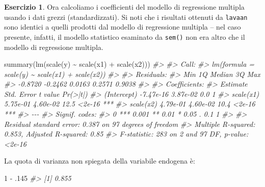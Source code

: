 \documentclass[
  11pt,
]{krantz}
\makeatletter
\newenvironment{Shaded}{\begin{snugshade}}{\end{snugshade}}
\newcommand{\CommentTok}[1]{\textcolor[rgb]{0.37,0.37,0.37}{\textit{#1}}}
\newcommand{\DecValTok}[1]{\textcolor[rgb]{0.06,0.06,0.06}{#1}}
\newcommand{\FunctionTok}[1]{\textcolor[rgb]{0,0,0}{#1}}
\newcommand{\NormalTok}[1]{#1}
\newcommand{\SpecialCharTok}[1]{\textcolor[rgb]{0,0,0}{#1}}
\newenvironment{kframe}{%
\medskip{}
\setlength{\fboxsep}{.8em}
 \def\at@end@of@kframe{}%
 \ifinner\ifhmode%
  \def\at@end@of@kframe{\end{minipage}}%
  \begin{minipage}{\columnwidth}%
 \fi\fi%
 \def\FrameCommand##1{\hskip\@totalleftmargin \hskip-\fboxsep
 \colorbox{shadecolor}{##1}\hskip-\fboxsep
     \hskip-\linewidth \hskip-\@totalleftmargin \hskip\columnwidth}%
 \MakeFramed {\advance\hsize-\width
   \@totalleftmargin\z@ \linewidth\hsize
   \@setminipage}}%
 {\par\unskip\endMakeFramed%
 \at@end@of@kframe}
\renewenvironment{Shaded}{\begin{kframe}}{\end{kframe}}
\theoremstyle{definition}
\theoremstyle{definition}
\theoremstyle{definition}
\newtheorem{exercise}{Esercizio}[chapter]
\theoremstyle{definition}
\theoremstyle{remark}
\makeatother
\begin{document}
\begin{exercise}
Ora calcoliamo i coefficienti del modello di regressione multipla usando i dati grezzi (standardizzati). Si noti che i risultati ottenuti da \texttt{lavaan} sono identici a quelli prodotti dal modello di regressione multipla -- nel caso presente, infatti, il modello statistico esaminato da \texttt{sem()} non era altro che il modello di regressione multipla.

\begin{Shaded}
\begin{Highlighting}[]
\FunctionTok{summary}\NormalTok{(}\FunctionTok{lm}\NormalTok{(}\FunctionTok{scale}\NormalTok{(y) }\SpecialCharTok{\textasciitilde{}} \FunctionTok{scale}\NormalTok{(x1) }\SpecialCharTok{+} \FunctionTok{scale}\NormalTok{(x2)))}
\CommentTok{\#\textgreater{} }
\CommentTok{\#\textgreater{} Call:}
\CommentTok{\#\textgreater{} lm(formula = scale(y) \textasciitilde{} scale(x1) + scale(x2))}
\CommentTok{\#\textgreater{} }
\CommentTok{\#\textgreater{} Residuals:}
\CommentTok{\#\textgreater{}     Min      1Q  Median      3Q     Max }
\CommentTok{\#\textgreater{} {-}0.8720 {-}0.2462  0.0163  0.2571  0.9038 }
\CommentTok{\#\textgreater{} }
\CommentTok{\#\textgreater{} Coefficients:}
\CommentTok{\#\textgreater{}              Estimate Std. Error t value Pr(\textgreater{}|t|)    }
\CommentTok{\#\textgreater{} (Intercept) {-}7.47e{-}16   3.87e{-}02     0.0        1    }
\CommentTok{\#\textgreater{} scale(x1)    5.75e{-}01   4.60e{-}02    12.5   \textless{}2e{-}16 ***}
\CommentTok{\#\textgreater{} scale(x2)    4.79e{-}01   4.60e{-}02    10.4   \textless{}2e{-}16 ***}
\CommentTok{\#\textgreater{} {-}{-}{-}}
\CommentTok{\#\textgreater{} Signif. codes:  }
\CommentTok{\#\textgreater{} 0 \textquotesingle{}***\textquotesingle{} 0.001 \textquotesingle{}**\textquotesingle{} 0.01 \textquotesingle{}*\textquotesingle{} 0.05 \textquotesingle{}.\textquotesingle{} 0.1 \textquotesingle{} \textquotesingle{} 1}
\CommentTok{\#\textgreater{} }
\CommentTok{\#\textgreater{} Residual standard error: 0.387 on 97 degrees of freedom}
\CommentTok{\#\textgreater{} Multiple R{-}squared:  0.853,  Adjusted R{-}squared:  0.85 }
\CommentTok{\#\textgreater{} F{-}statistic:  283 on 2 and 97 DF,  p{-}value: \textless{}2e{-}16}
\end{Highlighting}
\end{Shaded}

La quota di varianza non spiegata della variabile endogena è:

\begin{Shaded}
\begin{Highlighting}[]
\DecValTok{1} \SpecialCharTok{{-}}\NormalTok{ .}\DecValTok{145}
\CommentTok{\#\textgreater{} [1] 0.855}
\end{Highlighting}
\end{Shaded}

\end{exercise}
\end{document}
